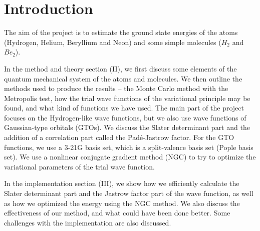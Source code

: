 \documentclass[twocolumns, a4paper,11pt,fleqn]{extarticle}
\title{}
\begin{document}

\section{Introduction} 
The aim of the project is to estimate the ground state energies of the
atoms (Hydrogen, Helium, Beryllium and Neon) and some simple molecules ($H_2$ and $Be_2$).

In the method and theory section (II), 
we first discuss some elements of the quantum mechanical system 
of the atoms and molecules.
We then outline the methods used to produce the results --
the Monte Carlo method with the Metropolis test, how the trial wave functions
of the variational principle may be found, and what kind of functions we have used.
The main part of the project focuses on the Hydrogen-like wave functions,
but we also use wave functions of Gaussian-type orbitals (GTOs).
We discuss the Slater determinant part and the addition of a
correlation part called the Pad\'e-Jastrow factor.
For the GTO functions, we use a 3-21G basis set, which is
a split-valence basis set (Pople basis set).
We use a nonlinear conjugate gradient method (NGC) to try to optimize the
variational parameters of the trial wave function.

In the implementation section (III), we show how we efficiently calculate the
Slater determinant part and the Jastrow factor part of the wave function,
as well as how we optimized the energy using the NGC method.
We also discuss the effectiveness of our method, and what could have been done better.
Some challenges with the implementation are also discussed.
\end{document}
